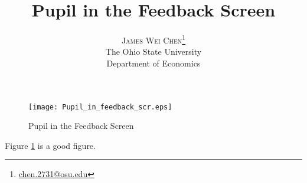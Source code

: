 \documentclass{article}
\title{\vspace{-15mm}\fontsize{24pt}{10pt}\selectfont\textbf{Pupil in the Feedback Screen}} %
\author{
\large
\textsc{James Wei Chen}\thanks{\href{mailto:chen.2731@osu.edu}{chen.2731@osu.edu}}\\[2mm] %
\normalsize The Ohio State University \\ %
\normalsize Department of Economics
\vspace{3mm}
}
\begin{document}
\maketitle %

\begin{figure}[!h]
\centering
\texttt{[image: Pupil\_in\_feedback\_scr.eps]}
\caption{Pupil in the Feedback Screen}\label{pifs}
\end{figure}

Figure \ref{pifs} is a good figure.
\end{document}
